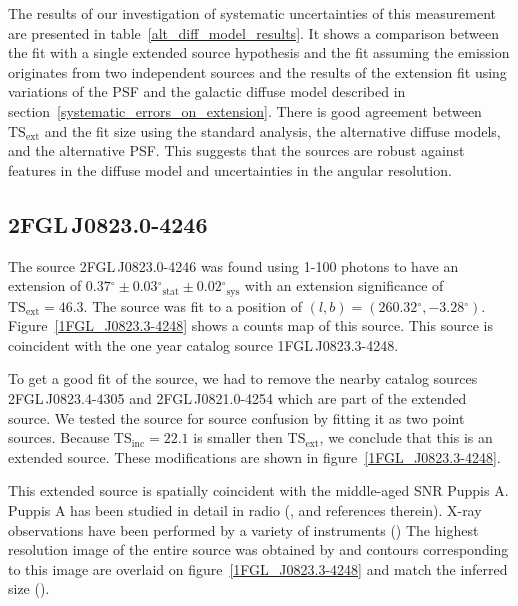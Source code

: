 \documentclass[12pt,preprint]{aastex}
\newcommand{\gev}{\text{GeV}\xspace}
\newcommand{\tsext}{{\ensuremath{\text{TS}_{\text{ext}}}}\xspace}
\newcommand{\tsinc}{\ensuremath{\text{TS}_{\text{inc}}}\xspace}
\newcommand{\rosat}{\text{{\em ROSAT}}\xspace}
\newcommand{\sys}{\text{sys}\xspace}
\newcommand{\stat}{\text{stat}\xspace}
\renewcommand{\deg}{\ensuremath{^\circ}\xspace}
\begin{document}
The results of our investigation of systematic uncertainties of this
measurement are presented in 
table~\ref{alt_diff_model_results}.  It
shows a comparison between the fit with a single extended source
hypothesis and the fit assuming the emission originates from two
independent sources and  the
results of the extension fit using variations of the PSF and the galactic
diffuse model described in section~\ref{systematic_errors_on_extension}.
There is good agreement between \tsext and the fit size using
the standard analysis, the alternative diffuse models, and the alternative PSF.
This suggests that the sources are robust against features in the diffuse
model and uncertainties in the angular resolution.

\subsection{2FGL\,J0823.0-4246}
\label{section_2FGL_J0823.0-4246}


The source 2FGL\,J0823.0-4246 was found 
using 1-100 \gev photons to have an 
extension of $0.37\deg\pm0.03\deg_\stat\pm0.02\deg_\sys$ 
with an extension
significance of $\tsext=46.3$.  The source was fit to a position of
$(l,b)=(260.32\deg,-3.28\deg)$.  Figure~\ref{1FGL_J0823.3-4248} shows a
counts map of this source.  This source is coincident with the one year
catalog source 1FGL\,J0823.3-4248.

To get a good fit of the source, we had to remove the nearby catalog
sources 2FGL\,J0823.4-4305 and 2FGL\,J0821.0-4254 which are part of the
extended source.  We tested the source for source confusion by fitting
it as two point sources. Because $\tsinc=22.1$ is smaller then \tsext,
we conclude that this is an extended source.  These modifications are
shown in figure~\ref{1FGL_J0823.3-4248}.

This extended source is spatially coincident with the middle-aged
SNR Puppis A.  Puppis A has been studied in detail in radio
(\cite{puppis_a_vla}, and references therein).  X-ray observations
have been performed by a variety of instruments 
(\cite{einstein_puppis_a,rosat_puppis_a,chandra_puppis_a,xmm_newton_puppis_a,suzaku_puppis_a})
The highest resolution image of the entire source was obtained
by \rosat and contours corresponding to this
image are overlaid on figure~\ref{1FGL_J0823.3-4248} and match the
inferred \gev size (\cite{rosat_puppis_a}).
\end{document}
